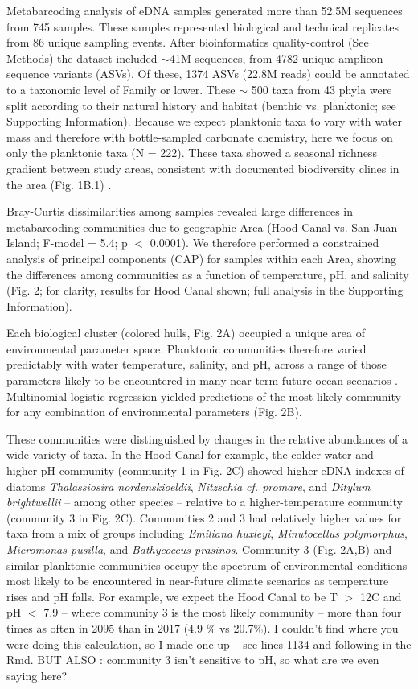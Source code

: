 \documentclass[11pt]{article}
\begin{document}
\begin{linenumbers}
Metabarcoding analysis of eDNA samples generated more than 52.5M sequences from 745 samples. These samples represented biological and technical replicates from 86 unique sampling events. After bioinformatics quality-control (See Methods) the dataset included $\sim${}41M sequences, from 4782 unique amplicon sequence variants (ASVs). Of these, 1374 ASVs (22.8M reads) could be annotated to a taxonomic level of Family or lower. These $\sim$ 500 taxa from 43 phyla were split according to their natural history and habitat (benthic vs. planktonic; see Supporting Information). Because we expect planktonic taxa to vary with water mass \cite{kelly2018tides} and therefore with bottle-sampled carbonate chemistry, here we focus on only the planktonic taxa (N = 222). These taxa showed a seasonal richness gradient between study areas, consistent with documented biodiversity clines in the area (Fig. 1B.1) \cite{dethier_decadal_2008}.

Bray-Curtis dissimilarities among samples revealed large differences in metabarcoding communities due to geographic Area (Hood Canal vs. San Juan Island; F-model = 5.4; p $<$ 0.0001). We therefore performed a constrained analysis of principal components (CAP) for samples within each Area, showing the differences among communities as a function of temperature, pH, and salinity (Fig. 2; for clarity, results for Hood Canal shown; full analysis in the Supporting Information). 

 Each biological cluster (colored hulls, Fig. 2A) occupied a unique area of environmental parameter space. Planktonic communities therefore varied predictably with water temperature, salinity, and pH, across a range of those parameters likely to be encountered in many near-term future-ocean scenarios \cite{murray2015inland}. 
 Multinomial logistic regression yielded predictions of the most-likely community for any combination of environmental parameters (Fig. 2B).

These communities were distinguished by changes in the relative abundances of a wide variety of taxa. In the Hood Canal for example, the colder water and higher-pH community (community 1 in Fig. 2C) showed higher eDNA indexes of diatoms \textit{Thalassiosira nordenskioeldii}, \textit{Nitzschia cf. promare}, and \textit{Ditylum brightwellii} -- among other species -- relative to a higher-temperature community (community 3 in Fig. 2C). Communities 2 and 3 had relatively higher values for taxa from a mix of groups including \textit{Emiliana huxleyi}, \textit{Minutocellus polymorphus}, \textit{Micromonas pusilla}, and \textit{Bathycoccus prasinos}. Community 3 (Fig. 2A,B) and similar planktonic communities occupy the spectrum of environmental conditions most likely to be encountered in near-future climate scenarios as temperature rises and pH falls. For example, we expect the Hood Canal to be T $>$ 12\degree C and pH $<$ {7.9} -- where community 3 is the most likely community -- more than four times as often in 2095 than in 2017 (4.9 \% vs 20.7\%). {\color{blue} I couldn't find where you were doing this calculation, so I made one up -- see lines 1134 and following in the Rmd. BUT ALSO : community 3 isn't sensitive to pH, so what are we even saying here?}


\end{linenumbers}
\end{document}
